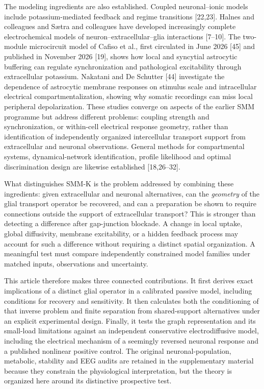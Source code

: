 \documentclass[
  11pt,
]{article}
\begin{document}
The modeling ingredients are also established. Coupled neuronal--ionic models include potassium-mediated feedback and regime transitions {[}22,23{]}. Halnes and colleagues and Sætra and colleagues have developed increasingly complete electrochemical models of neuron--extracellular--glia interactions {[}7--10{]}. The two-module microcircuit model of Cafiso et al., first circulated in June 2026 {[}45{]} and published in November 2026 {[}19{]}, shows how local and syncytial astrocytic buffering can regulate synchronization and pathological excitability through extracellular potassium. Nakatani and De Schutter {[}44{]} investigate the dependence of astrocytic membrane responses on stimulus scale and intracellular electrical compartmentalization, showing why somatic recordings can miss local peripheral depolarization. These studies converge on aspects of the earlier SMM programme but address different problems: coupling strength and synchronization, or within-cell electrical response geometry, rather than identification of independently organized intercellular transport support from extracellular and neuronal observations. General methods for compartmental systems, dynamical-network identification, profile likelihood and optimal discrimination design are likewise established {[}18,26--32{]}.

What distinguishes SMM-K is the problem addressed by combining these
ingredients: given extracellular and neuronal alternatives, can the
\emph{geometry} of the glial transport operator be recovered, and can a
preparation be shown to require connections outside the support of
extracellular transport? This is stronger than detecting a difference
after gap-junction blockade. A change in local uptake, global
diffusivity, membrane excitability, or a hidden feedback process may
account for such a difference without requiring a distinct spatial
organization. A meaningful test must compare independently constrained
model families under matched inputs, observations and uncertainty.

This article therefore makes three connected contributions. It first
derives exact implications of a distinct glial operator in a calibrated
passive model, including conditions for recovery and sensitivity. It
then calculates both the conditioning of that inverse problem and finite
separation from shared-support alternatives under an explicit
experimental design. Finally, it tests the graph representation and its
small-load limitations against an independent conservative
electrodiffusive model, including the electrical mechanism of a
seemingly reversed neuronal response and a published nonlinear positive
control. The original neuronal-population, metabolic, stability and EEG
audits are retained in the supplementary material because they constrain
the physiological interpretation, but the theory is organized here
around its distinctive prospective test.
\end{document}
